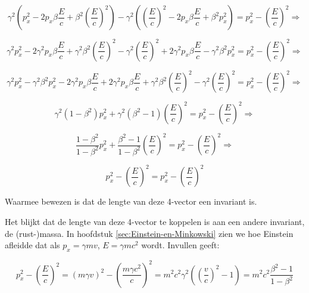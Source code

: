 \begin{equation}
\gamma^{2}\left(p_{x}^{2}-2p_{x}\beta\frac{E}{c}+\beta^{2}\left(\frac{E}{c}\right)^{2}\right)-\gamma^{2}\left(\left(\frac{E}{c}\right)^{2}-2p_{x}\beta\frac{E}{c}+\beta^{2}p_{x}^{2}\right)
=p_{x}^{2}-\left(\frac{E}{c}\right)^{2}\Rightarrow
\end{equation}


\begin{equation}
\gamma^{2}p_{x}^{2}-2\gamma^{2}p_{x}\beta\frac{E}{c}+\gamma^{2}\beta^{2}\left(\frac{E}{c}\right)^{2}-\gamma^{2}\left(\frac{E}{c}\right)^{2}+2\gamma^{2}p_{x}\beta\frac{E}{c}-\gamma^{2}\beta^{2}p_{x}^{2}
=p_{x}^{2}-\left(\frac{E}{c}\right)^{2}\Rightarrow
\end{equation}


\begin{equation}
\gamma^{2}p_{x}^{2}-\gamma^{2}\beta^{2}p_{x}^{2}-2\gamma^{2}p_{x}\beta\frac{E}{c}+2\gamma^{2}p_{x}\beta\frac{E}{c}+\gamma^{2}\beta^{2}\left(\frac{E}{c}\right)^{2}-\gamma^{2}\left(\frac{E}{c}\right)^{2}
=p_{x}^{2}-\left(\frac{E}{c}\right)^{2}\Rightarrow
\end{equation}


\begin{equation}
\gamma^{2}\left(1-\beta^{2}\right)p_{x}^{2}+\gamma^{2}\left(\beta^{2}-1\right)\left(\frac{E}{c}\right)^{2}
=p_{x}^{2}-\left(\frac{E}{c}\right)^{2}\Rightarrow
\end{equation}


\begin{equation}
\frac{1-\beta^{2}}{1-\beta^{2}}p_{x}^{2}+\frac{\beta^{2}-1}{1-\beta^{2}}\left(\frac{E}{c}\right)^{2}
=p_{x}^{2}-\left(\frac{E}{c}\right)^{2}\Rightarrow
\end{equation}


\begin{equation}
p_{x}^{2}-\left(\frac{E}{c}\right)^{2}
=p_{x}^{2}-\left(\frac{E}{c}\right)^{2}
\end{equation}


Waarmee bewezen is dat de lengte van deze 4-vector een invariant is.

Het blijkt dat de lengte van deze 4-vector te koppelen is aan een
andere invariant, de (rust-)massa. In hoofdstuk  \ref{sec:Einstein-en-Minkowski}
zien we hoe Einstein afleidde dat als $p_{x}=\gamma mv$, $E=\gamma mc^{2}$
wordt. Invullen geeft:

\begin{equation}
p_{x}^{2}-\left(\frac{E}{c}\right)^{2}
=\left(m\gamma v\right)^{2}-\left(\frac{m\gamma c^{2}}{c}\right)^{2}
=m^{2}c^{2}\gamma^{2}\left(\left(\frac{v}{c}\right)^{2}-1\right)
=m^{2}c^{2}\frac{\beta^{2}-1}{1-\beta^{2}}
\end{equation}


